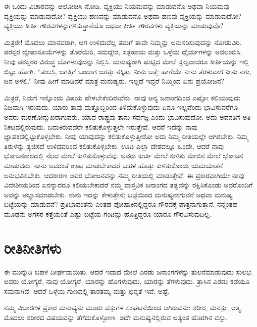 ಈ ಒಂದು ವಿಚಾರವನ್ನು ಆಲೋಚಿಸಿ ನೋಡಿ. ವ್ಯಕ್ತಿಯು ನಿಯಮವನ್ನು ಮಾಡುವನೊ ಅಥವಾ ನಿಯಮವು ವ್ಯಕ್ತಿಯನ್ನು ಮಾಡುವುದೋ? ವ್ಯಕ್ತಿಯು ಹಣವನ್ನು ಮಾಡುವನೊ ಅಥವಾ ಹಣವು ವ್ಯಕ್ತಿಯನ್ನು ಮಾಡುವುದೋ? ವ್ಯಕ್ತಿಯು ಕೀರ್ತಿ ಗೌರವಗಳನ್ನು\-ಗಳಿಸುತ್ತಾನೆಯೊ ಆಥವಾ ಕೀರ್ತಿ ಗೌರವಗಳು ವ್ಯಕ್ತಿಯನ್ನು ಮಾಡುವುವೊ?

ಮಿತ್ರರೇ! ಮೊದಲು ಮಾನವರಾಗಿ, ಆಗ ಉಳಿದುದೆಲ್ಲ ತಮಗೆ ತಾವೇ ನಿಮ್ಮನ್ನು ಅನುಸರಿಸುವುದನ್ನು ನೋಡುವಿರಿ. ಪರಸ್ಪರ ದ್ವೇಷಾಸೂಯೆಗಳನ್ನು ತೊರೆಯಿರಿ, ಸದುದ್ದೇಶ, ಸತ್ಸಹಾಯ ಮತ್ತು ಒಳ್ಳೆಯ ಧೈರ್ಯಗಳನ್ನು ಅವಲಂಬಿಸಿ. ನೀವು ಪರಸ್ಪರರ ವಿರುದ್ಧ ಬೊಗಳುವುದನ್ನು ನಿಲ್ಲಿಸಿ. ಮನುಷ್ಯರಾಗಿ ಹುಟ್ಟಿದ ಮೇಲೆ ಸ್ವಲ್ಪವಾದರೂ ಕೀರ್ತಿಯನ್ನು ಇಲ್ಲಿ ಬಿಟ್ಟು ಹೋಗಿ. “ತುಲಸಿ, ಜಗತ್ತಿಗೆ ಬಂದಾಗ ಜಗತ್ತು ನಕ್ಕಿತು, ನೀನು ಅತ್ತೆ; ಹಾಗೆಯೇ ನೀನು ತೆರಳುವಾಗ ನೀನು ನಗು, ಜನ ಅಳಲಿ.” ನೀವು ಹೀಗೆ ಮಾಡಿದರೆ ಮಾತ್ರ ಮನುಷ್ಯರು. ಇಲ್ಲದೆ ಇದ್ದರೆ ನಿಮ್ಮಿಂದ ಏನು ಪ್ರಯೋಜನ?

ಮಿತ್ರರೆ, ನಿಮಗೆ ಇನ್ನೊಂದು ವಿಷಯ ಹೇಳಬೇಕೆಂದಿರುವೆನು. ನಾವು ಅನ್ಯ ಜನಾಂಗದಿಂದ ಎಷ್ಟೋ ಕಲಿಯುವುದು ನಿಜವಾಗಿ ಇರುವುದು. ಯಾರು ತಾವು ಮತ್ತೊಬ್ಬರಿಂದ ತಿಳಿದುಕೊಳ್ಳುವುದು ಏನೂ ಇಲ್ಲವೆಂದು ಭಾವಿಸುವರೆಗೂ ಅವರು ಮರಣೋನ್ಮುಖರಾಗು\-ವರು. ಯಾವ ರಾಷ್ಟ್ರವು ತಾನು ಸರ್ವಜ್ಞ ಎಂದು ಭಾವಿಸುವುದೋ, ಅದು ಅವನತಿಗೆ ಅತಿ ನಿಕಟದಲ್ಲಿರುವುದು. ಬದುಕಿರುವವರೇ ಕಲಿತುಕೊಳ್ಳುತ್ತಲೇ ಇರುತ್ತೇವೆ. ಆದರೆ ಇದನ್ನು ನಾವು ಜ್ಞಾಪಕದಲ್ಲಿಟ್ಟುಕೊಳ್ಳಬೇಕು. ನೀವು ಯಾವುದನ್ನು ಕಲಿತುಕೊಳ್ಳುತ್ತೀರೋ ಅದು ನಿಮ್ಮ ರೀತಿಯಲ್ಲೇ ಆಗಿರಬೇಕು. ನಿಮ್ಮ ತಿರುಳನ್ನು ತ್ಯಜಿಸದೆ ಉಳಿದವರಿಂದ ಕಲಿತುಕೊಳ್ಳಬೇಕು. ಊಟ ಎಲ್ಲಾ ದೇಶದಲ್ಲೂ ಒಂದೇ. ಆದರೆ ನಾವು ಭೋಜನಕಾಲದಲ್ಲಿ ನೆಲದ ಮೇಲೆ ಕುಳಿತುಕೊಳ್ಳುವೆವು. ಅವರು ಕುರ್ಚಿ ಮೇಲೆ ಕುಳಿತು ಮೇಜಿನ ಮೇಲೆ ಭೋಜನ ಮಾಡುವರು. ನಾನು ಅವರಂತೆ ಊಟ ಮಾಡಬೇಕಾದರೆ ಬಹಳ ಹೊತ್ತು ಕುಳಿತುಕೊಂಡು ಯಮಯಾತನೆ ಅನುಭವಿಸಬೇಕು. ಆದಕಾರಣ ಅವರ ಭೋಜನವನ್ನು ನಮ್ಮ ರೀತಿಯಲ್ಲಿ ಮಾಡುತ್ತೇವೆ. ಈ ಪ್ರಕಾರವಾಗಿಯೇ ನಾವು ವಿದೇಶೀಯರಿಂದ ಏನನ್ನಾದರೂ ಕಲಿಯಬೇಕಾದರೆ ನಮ್ಮ ವಾಸ್ತವಿಕ ಜನಾಂಗದ ತತ್ವವನ್ನು ರಕ್ಷಿಸಿಕೊಂಡು ಅವರೊಂದಿಗೆ ಅವನ್ನು ಅಭ್ಯಾಸಮಾಡಬೇಕು. ನಾನು ಇದನ್ನು ಕೇಳುತ್ತೇನೆ; ಬಟ್ಟೆಯಿಂದ ಮನುಷ್ಯನಾಗುವನೆ ಅಥವಾ ಮನುಷ್ಯ ಬಟ್ಟೆಯನ್ನು ಮಾಡುವನೆ? ಪ್ರತಿಭಾವಂತನು ಎಂತಹ ಪೋಷಾಕಿನಲ್ಲಿದ್ದರೂ ಗೌರವಕ್ಕೆ ಪಾತ್ರನಾಗುತ್ತಾನೆ, ನನ್ನಂತಹ ಮೂಢನು ಅಗಸರ ಕತ್ತೆಯಂತೆ ಎಷ್ಟು ಬಟ್ಟೆಯ ಗಂಟನ್ನು ಹೊತ್ತಿದ್ದರೂ ಯಾರೂ ಗೌರವಿಸುವುದಿಲ್ಲ.

\newpage

\section*{ರೀತಿನೀತಿಗಳು}

ಈ ಮುನ್ನುಡಿ ಬಹಳ ದೀರ್ಘವಾಯಿತು. ಆದರೆ ಇದಾದ ಮೇಲೆ ಎರಡು ಜನಾಂಗಗಳನ್ನು ತುಲನೆಮಾಡುವುದು ಸುಲಭ. ಅವರು ಯೋಗ್ಯರೆ, ನಾವು ಯೋಗ್ಯರೆ, ಯಾರನ್ನು ಹೊಗಳುವುದು, ಯಾರನ್ನು ತೆಗಳುವುದು. ತ್ರಾಸಿನ ಎರಡು ಕಡೆಯೂ ಸಮನಾಗಿದೆ. ಆದರೆ ಒಳ್ಳೆಯ ಗುಣದಲ್ಲಿ ತಾರತಮ್ಯ ಮತ್ತು ಭಿನ್ನತೆ ಇವೆ, ಅಷ್ಟೆ.

ನಮ್ಮ ವಿಚಾರಗಳ ಪ್ರಕಾರ ಮನುಷ್ಯನು ಮೂರು ವಸ್ತುಗಳ ಸಂಘಟನೆಯಿಂದ ಆಗಿರುವನು: ಶರೀರ, ಮನಸ್ಸು, ಆತ್ಮ. ಮೊದಲು ಶರೀರದ ವಿಷಯವನ್ನು ತೆಗೆದುಕೊಳ್ಳೋಣ. ಅದೇ ಮನುಷ್ಯನಲ್ಲಿರುವ ಅತ್ಯಂತ ಹೊರಗಿನ ವಸ್ತು.

